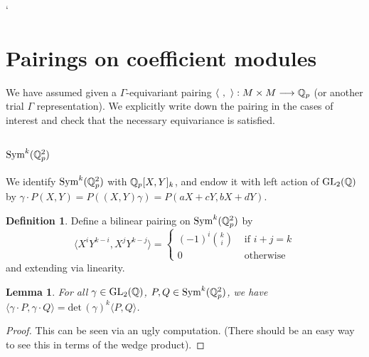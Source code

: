 `\documentclass[12pt]{article}
\newtheorem{lem}[thm]{Lemma}
\theoremstyle{definition}
\newtheorem{defn}[thm]{Definition}
\def\Q{{\Bbb Q}}
\def\det{\text{det}\,}
\def\GL{\operatorname{GL}}
\def\Sym{\operatorname{Sym}}
\def\GL{\operatorname{GL}}
\def\CoInd{\operatorname{CoInd}}
\begin{document}
%
%
%

\section{Pairings on coefficient modules}

We have assumed given a $\Gamma$-equivariant pairing $\langle~,~ \rangle : M\times M \longrightarrow \Q_p$ (or another trial $\Gamma$ representation). We explicitly write down the pairing in the cases of interest and check that the necessary equivariance is satisfied. 

\subsection{$\Sym^k(\Q_p^2)$}

We identify $\Sym^k(\Q_p^2)$ with $\Q_p[X,Y]_k$, and endow it with left action of $\GL_2(\Q)$ by $\gamma \cdot P(X,Y) = P((X,Y)\gamma)=P(aX+cY,bX+dY).$ 
\begin{defn}
Define a bilinear pairing on $\Sym^k(\Q_p^2)$ by
\begin{equation*}
	\langle X^iY^{k-i}, X^j Y^{k-j} \rangle = \begin{cases} (-1)^i {k \choose i} & \text{ if } i+j=k\\
												0	& \text{ otherwise} \end{cases}
\end{equation*}
and extending via linearity.
\end{defn}


\begin{lem}
For all $\gamma\in \GL_2(\Q)$, $P,Q\in\Sym^k(\Q_p^2)$, we have $\langle \gamma\cdot P,\gamma \cdot Q\rangle = \det(\gamma)^k \langle P,Q\rangle$.
\end{lem}
\begin{proof}
This can be seen via an ugly computation. (There should be an easy way to see this in terms of the wedge product).
\end{proof}
\end{document}
